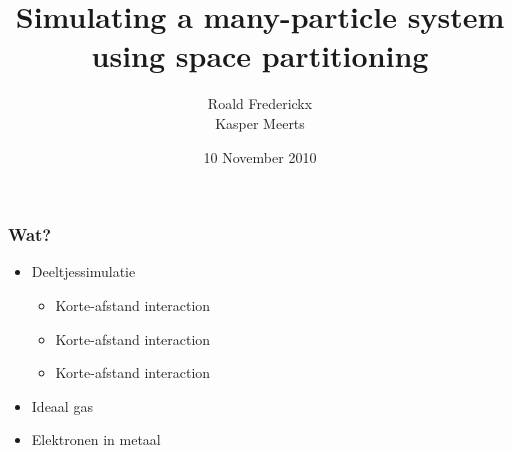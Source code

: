 \documentclass{beamer}
\title{Simulating a many-particle system using space partitioning}
\author{Roald Frederickx\\Kasper Meerts}
\date{10 November 2010}
\newcommand{\items}[1]{\begin{itemize} #1 \end{itemize}}
\begin{document}
\begin{frame}
\titlepage
\end{frame}

\begin{frame}
\tableofcontents
\end{frame}

\begin{frame}
\frametitle{Wat?}
\items{
\item Deeltjessimulatie
	\begin{itemize}
		\item{Korte-afstand interaction}
		\item{Korte-afstand interaction}
		\item{Korte-afstand interaction}
	\end{itemize}
\item Ideaal gas
\item Elektronen in metaal
}
\end{frame}
\end{document}
